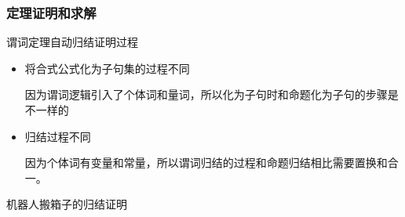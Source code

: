 \subsubsection{定理证明和求解}
\begin{note}
    谓词定理自动归结证明过程
    \begin{itemize}
        \item 将合式公式化为子句集的过程不同
        
        因为谓词逻辑引入了个体词和量词，所以化为子句时和命题化为子句的步骤是不一样的
        \item 归结过程不同
        
        因为个体词有变量和常量，所以谓词归结的过程和命题归结相比需要置换和合一。
    \end{itemize}
\end{note}
\begin{example}
    机器人搬箱子的归结证明


\end{example}
